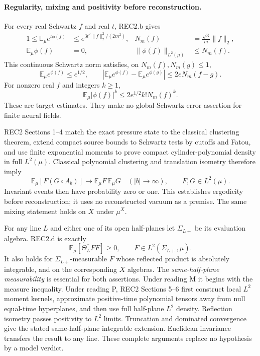 \documentclass[11pt]{article}
\theoremstyle{plain}
\theoremstyle{definition}
\theoremstyle{remark}
\newcommand{\E}{\mathbb{E}}
\begin{document}
\paragraph{Regularity, mixing and positivity before reconstruction.}
For every real Schwartz $f$ and real $t$, REC2.b gives
\begin{align}
 1\le\E_\mu e^{t\phi(f)}
 &\le e^{3t^2\|f\|_2^2/(2m^2)},
 &N_m(f)&=\frac{\sqrt3}{m}\|f\|_2,
 \label{qrs:Schwartz}\\
 \E_\mu\phi(f)&=0,
 &\|\phi(f)\|_{L^2(\mu)}&\le N_m(f).\nonumber
\end{align}
This continuous Schwartz norm satisfies, on $N_m(f),N_m(g)\le1$,
\begin{equation}\label{qrs:unitball}
 \E_\mu e^{\phi(f)}\le e^{1/2},\qquad
 |\E_\mu e^{\phi(f)}-\E_\mu e^{\phi(g)}|
       \le2eN_m(f-g).
\end{equation}
For nonzero real $f$ and integers $k\ge1$,
\begin{equation}\label{qrs:moment}
 \E_\mu|\phi(f)|^k\le2e^{1/2}k!N_m(f)^k.
\end{equation}
These are target estimates. They make no global Schwartz error assertion
for finite neural fields.

REC2 Sections 1--4 match the exact pressure state to the classical
clustering theorem, extend compact source bounds to Schwartz tests by
cutoffs and Fatou, and use finite exponential moments to prove compact
cylinder-polynomial density in full $L^2(\mu)$. Classical polynomial
clustering and translation isometry therefore imply
\begin{equation}\label{qrs:mixing}
 \E_\mu[F(G\circ A_b)]\longrightarrow\E_\mu F\,\E_\mu G
 \quad (|b|\to\infty),\qquad F,G\in L^2(\mu).
\end{equation}
Invariant events then have probability zero or one. This establishes
ergodicity before reconstruction; it uses no reconstructed vacuum as a
premise. The same mixing statement holds on $X$ under $\mu^X$.

For any line $L$ and either one of its open half-planes let
$\Sigma_{L+}$ be its evaluation algebra. REC2.d is exactly
\begin{equation}\label{qrs:OS}
 \E_\mu[\overline{\Theta_L F}F]\ge0,
 \qquad F\in L^2(\Sigma_{L+},\mu).
\end{equation}
It also holds for $\Sigma_{L+}$-measurable $F$ whose reflected product is
absolutely integrable, and on the corresponding $X$ algebras. The
\emph{same-half-plane measurability} is essential for both assertions.
Under reading M it begins with the measure inequality. Under reading P,
REC2 Sections 5--6 first construct local $L^2$ moment kernels, approximate
positive-time polynomial tensors away from null equal-time hyperplanes,
and then use full half-plane $L^2$ density. Reflection isometry passes
positivity to $L^2$ limits. Truncation and dominated convergence give the
stated same-half-plane integrable extension. Euclidean invariance transfers
the result to any line. These complete arguments replace no hypothesis
by a model verdict.
\end{document}
